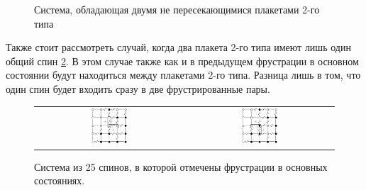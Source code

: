 \documentclass[utf8, babel, sor, jor, amsmath, amssymb, reprint]{elsarticle} %
\begin{document}
\begin{figure}[H]
	\centering
	\caption{Система, обладающая двумя не пересекающимися плакетами 2-го типа}
	\label{fig:4x7}
\end{figure}

Также стоит рассмотреть случай, когда два плакета 2-го типа имеют лишь один общий спин \ref{fig:5x5.22F}. В этом случае также как и в предыдущем фрустрации в основном состоянии будут находиться между плакетами 2-го типа. Разница лишь в том, что один спин будет входить сразу в две фрустрированные пары.

\begin{figure}[H]
	\centering
	\begin{tabular}{cc}
		\includegraphics[width=0.25\textwidth]{pictures/1_Cl5x5_Type2_gs1.eps} & \hspace{0.05\textwidth}
		\includegraphics[width=0.25\textwidth]{pictures/1_Cl5x5_Type2_gs2.eps} 
	\end{tabular}
	\caption{Система из 25 спинов, в которой отмечены фрустрации в основных состояниях.}
	\label{fig:5x5.22F}
\end{figure}
\end{document}
